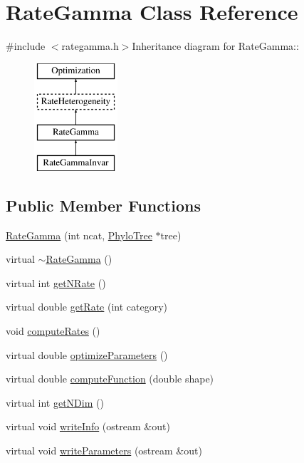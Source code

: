 \hypertarget{classRateGamma}{
\section{RateGamma Class Reference}
\label{classRateGamma}
}


{\ttfamily \#include $<$rategamma.h$>$}Inheritance diagram for RateGamma::\begin{figure}[H]
\begin{center}
\leavevmode
\includegraphics[height=4cm]{classRateGamma}
\end{center}
\end{figure}
\subsection*{Public Member Functions}
\begin{DoxyCompactItemize}
\item 
\hyperlink{classRateGamma_a040b97ec98732b29809b6cd03055b441}{RateGamma} (int ncat, \hyperlink{classPhyloTree}{PhyloTree} $\ast$tree)
\item 
virtual \hyperlink{classRateGamma_a5989cd3261ba9ae18d3fd23f532b74e2}{$\sim$RateGamma} ()
\item 
virtual int \hyperlink{classRateGamma_a115dac63aaa8fc7ac256304506ef3307}{getNRate} ()
\item 
virtual double \hyperlink{classRateGamma_a2e459469fd578b9d5d8bb18000d9d1d9}{getRate} (int category)
\item 
void \hyperlink{classRateGamma_a487fec4116b061846ec8cf1dd5d5b43f}{computeRates} ()
\item 
virtual double \hyperlink{classRateGamma_aadba870d743295ef057f9c78ac7fdd06}{optimizeParameters} ()
\item 
virtual double \hyperlink{classRateGamma_a24e01b7ec0d9170ceebcf03b603b2bbb}{computeFunction} (double shape)
\item 
virtual int \hyperlink{classRateGamma_af271c0115c8a81ff6fac32d1cfef6187}{getNDim} ()
\item 
virtual void \hyperlink{classRateGamma_a835bb210fd8fb4552613fe49875cbfb5}{writeInfo} (ostream \&out)
\item 
virtual void \hyperlink{classRateGamma_a88ffb33131f2cf23cfd0525e092c7717}{writeParameters} (ostream \&out)
\end{DoxyCompactItemize}
